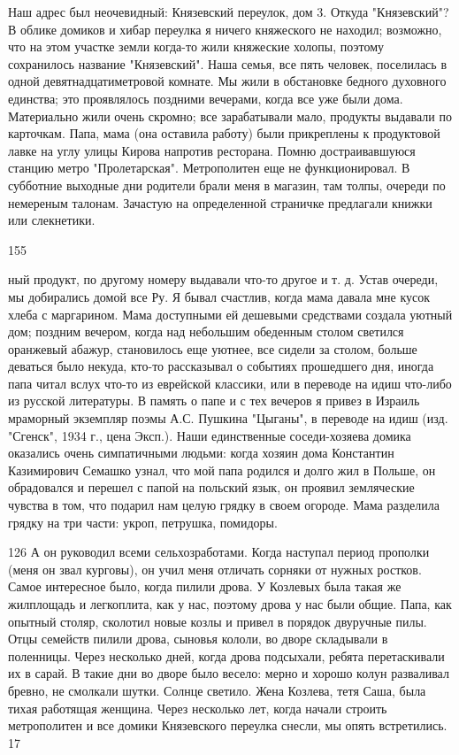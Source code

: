 Наш адрес был неочевидный: Князевский переулок, дом 3. Откуда "Князевский"? В облике домиков и хибар переулка я ничего княжеского не находил; возможно, что на этом участке земли когда-то жили княжеские холопы, поэтому сохранилось название "Князевский". Наша семья, все пять человек, поселилась в одной девятнадцатиметровой комнате. Мы жили в обстановке бедного духовного единства; это проявлялось поздними вечерами, когда все уже были дома. Материально жили очень скромно; все зарабатывали мало, продукты выдавали по карточкам. Папа, мама (она оставила работу) были прикреплены к продуктовой лавке на углу улицы Кирова напротив ресторана. Помню достраивавшуюся станцию метро "Пролетарская". Метрополитен еще не функционировал. В субботние выходные дни родители брали меня в магазин, там толпы, очереди по немереным талонам. Зачастую на определенной страничке предлагали книжки или слекнетики.

155

ный продукт, по другому номеру выдавали что-то другое и т. д. Устав очереди, мы добирались домой все Ру. Я бывал счастлив, когда мама давала мне кусок хлеба с маргарином. Мама доступными ей дешевыми средствами создала уютный дом; поздним вечером, когда над небольшим обеденным столом светился оранжевый абажур, становилось еще уютнее, все сидели за столом, больше деваться было некуда, кто-то рассказывал о событиях прошедшего дня, иногда папа читал вслух что-то из еврейской классики, или в переводе на идиш что-либо из русской литературы. В память о папе и с тех вечеров я привез в Израиль мраморный экземпляр поэмы А.С. Пушкина "Цыганы", в переводе на идиш (изд. "Сгенск", 1934 г., цена Эксп.). Наши единственные соседи-хозяева домика оказались очень симпатичными людьми: когда хозяин дома Константин Казимирович Семашко узнал, что мой папа родился и долго жил в Польше, он обрадовался и перешел с папой на польский язык, он проявил земляческие чувства в том, что подарил нам целую грядку в своем огороде. Мама разделила грядку на три части: укроп, петрушка, помидоры.

126
А он руководил всеми сельхозработами. Когда наступал период прополки (меня он звал курговы), он учил меня отличать сорняки от нужных ростков. Самое интересное было, когда пилили дрова. У Козлевых была такая же жилплощадь и легкоплита, как у нас, поэтому дрова у нас были общие. Папа, как опытный столяр, сколотил новые козлы и привел в порядок двуручные пилы. Отцы семейств пилили дрова, сыновья кололи, во дворе складывали в поленницы. Через несколько дней, когда дрова подсыхали, ребята перетаскивали их в сарай. В такие дни во дворе было весело: мерно и хорошо колун разваливал бревно, не смолкали шутки. Солнце светило. Жена Козлева, тетя Саша, была тихая работящая женщина. Через несколько лет, когда начали строить метрополитен и все домики Князевского переулка снесли, мы опять встретились.
\clearpage
17

